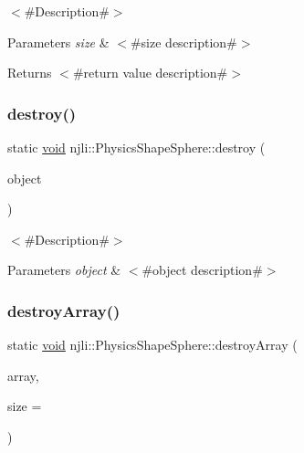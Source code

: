 $<$\#\+Description\#$>$


\begin{DoxyParams}{Parameters}
{\em size} & $<$\#size description\#$>$\\
\hline
\end{DoxyParams}
\begin{DoxyReturn}{Returns}
$<$\#return value description\#$>$ 
\end{DoxyReturn}
\mbox{\label{classnjli_1_1_physics_shape_sphere_af539bed7a0cb19660a3e7993e8777543}} 
\subsubsection{\texorpdfstring{destroy()}{destroy()}}
{\footnotesize\ttfamily static \mbox{\hyperlink{_thread_8h_af1e856da2e658414cb2456cb6f7ebc66}{void}} njli\+::\+Physics\+Shape\+Sphere\+::destroy (\begin{DoxyParamCaption}\item[{\mbox{\hyperlink{classnjli_1_1_physics_shape_sphere}{Physics\+Shape\+Sphere}} $\ast$}]{object }\end{DoxyParamCaption})\hspace{0.3cm}{\ttfamily [static]}}

$<$\#\+Description\#$>$


\begin{DoxyParams}{Parameters}
{\em object} & $<$\#object description\#$>$ \\
\hline
\end{DoxyParams}
\mbox{\label{classnjli_1_1_physics_shape_sphere_a2913ff7eb4b1a576cc0e0b832eab0eeb}} 
\subsubsection{\texorpdfstring{destroy\+Array()}{destroyArray()}}
{\footnotesize\ttfamily static \mbox{\hyperlink{_thread_8h_af1e856da2e658414cb2456cb6f7ebc66}{void}} njli\+::\+Physics\+Shape\+Sphere\+::destroy\+Array (\begin{DoxyParamCaption}\item[{\mbox{\hyperlink{classnjli_1_1_physics_shape_sphere}{Physics\+Shape\+Sphere}} $\ast$$\ast$}]{array,  }\item[{const \mbox{\hyperlink{_util_8h_a10e94b422ef0c20dcdec20d31a1f5049}{u32}}}]{size = {} }\end{DoxyParamCaption})\hspace{0.3cm}{\ttfamily [static]}}

